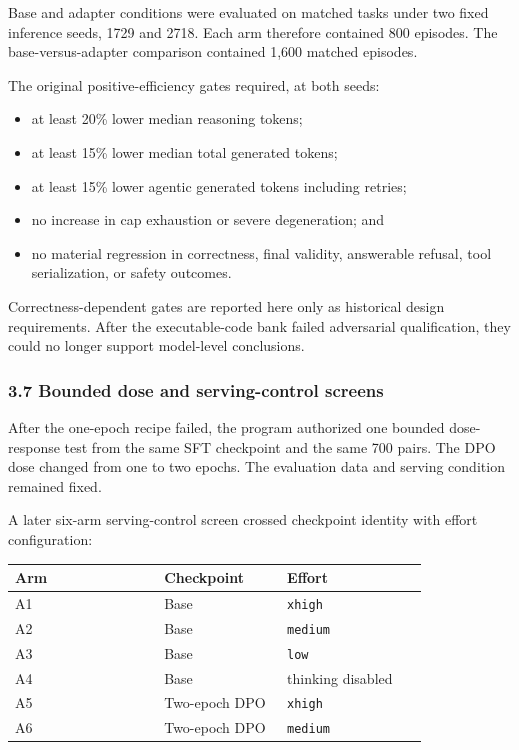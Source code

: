\documentclass[
]{article}
\newcounter{none} %
\providecommand{\tightlist}{%
  \setlength{\itemsep}{0pt}\setlength{\parskip}{0pt}}
\begin{document}
Base and adapter conditions were evaluated on matched tasks under two
fixed inference seeds, 1729 and 2718. Each arm therefore contained 800
episodes. The base-versus-adapter comparison contained 1,600 matched
episodes.

The original positive-efficiency gates required, at both seeds:

\begin{itemize}
\tightlist
\item
  at least 20\% lower median reasoning tokens;
\item
  at least 15\% lower median total generated tokens;
\item
  at least 15\% lower agentic generated tokens including retries;
\item
  no increase in cap exhaustion or severe degeneration; and
\item
  no material regression in correctness, final validity, answerable
  refusal, tool serialization, or safety outcomes.
\end{itemize}

Correctness-dependent gates are reported here only as historical design
requirements. After the executable-code bank failed adversarial
qualification, they could no longer support model-level conclusions.

\subsubsection{3.7 Bounded dose and serving-control
screens}\label{37-bounded-dose-and-serving-control-screens}

After the one-epoch recipe failed, the program authorized one bounded
dose-response test from the same SFT checkpoint and the same 700 pairs.
The DPO dose changed from one to two epochs. The evaluation data and
serving condition remained fixed.

A later six-arm serving-control screen crossed checkpoint identity with
effort configuration:

{\def\LTcaptype{none} %
\begin{longtable}[]{@{}p{0.34\linewidth}p{0.28\linewidth}p{0.32\linewidth}@{}}
\toprule\noalign{}
Arm & Checkpoint & Effort \\
\midrule\noalign{}
\endhead
\bottomrule\noalign{}
\endlastfoot
A1 & Base & \texttt{xhigh} \\
A2 & Base & \texttt{medium} \\
A3 & Base & \texttt{low} \\
A4 & Base & thinking disabled \\
A5 & Two-epoch DPO & \texttt{xhigh} \\
A6 & Two-epoch DPO & \texttt{medium} \\
\end{longtable}
}
\end{document}
